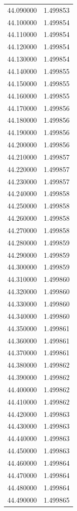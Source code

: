 \begin{tabular}{rr}
44.090000 & 1.499853 \\
44.100000 & 1.499854 \\
44.110000 & 1.499854 \\
44.120000 & 1.499854 \\
44.130000 & 1.499854 \\
44.140000 & 1.499855 \\
44.150000 & 1.499855 \\
44.160000 & 1.499855 \\
44.170000 & 1.499856 \\
44.180000 & 1.499856 \\
44.190000 & 1.499856 \\
44.200000 & 1.499856 \\
44.210000 & 1.499857 \\
44.220000 & 1.499857 \\
44.230000 & 1.499857 \\
44.240000 & 1.499858 \\
44.250000 & 1.499858 \\
44.260000 & 1.499858 \\
44.270000 & 1.499858 \\
44.280000 & 1.499859 \\
44.290000 & 1.499859 \\
44.300000 & 1.499859 \\
44.310000 & 1.499860 \\
44.320000 & 1.499860 \\
44.330000 & 1.499860 \\
44.340000 & 1.499860 \\
44.350000 & 1.499861 \\
44.360000 & 1.499861 \\
44.370000 & 1.499861 \\
44.380000 & 1.499862 \\
44.390000 & 1.499862 \\
44.400000 & 1.499862 \\
44.410000 & 1.499862 \\
44.420000 & 1.499863 \\
44.430000 & 1.499863 \\
44.440000 & 1.499863 \\
44.450000 & 1.499863 \\
44.460000 & 1.499864 \\
44.470000 & 1.499864 \\
44.480000 & 1.499864 \\
44.490000 & 1.499865 \\

\end{tabular}
